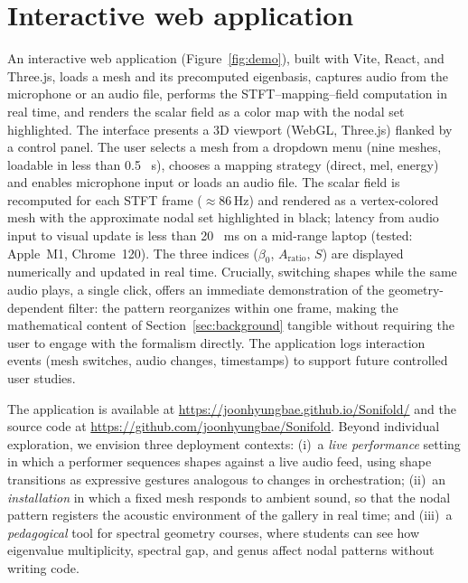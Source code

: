 \documentclass[]{interact}
\theoremstyle{plain}
\theoremstyle{definition}
\theoremstyle{remark}
\begin{document}
\section{Interactive web application}
\label{sec:interactive}

An interactive web application (Figure~\ref{fig:demo}), built with Vite, React, and Three.js, loads a mesh and its precomputed eigenbasis, captures audio from the microphone or an audio file, performs the STFT--mapping--field computation in real time, and renders the scalar field as a color map with the nodal set highlighted. The interface presents a 3D viewport (WebGL, Three.js) flanked by a control panel. The user selects a mesh from a dropdown menu (nine meshes, loadable in less than 0.5 \, s), chooses a mapping strategy (direct, mel, energy) and enables microphone input or loads an audio file. The scalar field is recomputed for each STFT frame (${\approx}86$\,Hz) and rendered as a vertex-colored mesh with the approximate nodal set highlighted in black; latency from audio input to visual update is less than 20 \, ms on a mid-range laptop (tested: Apple~M1, Chrome~120). The three indices ($\beta_0$, $A_{\mathrm{ratio}}$, $S$) are displayed numerically and updated in real time. Crucially, switching shapes while the same audio plays, a single click, offers an immediate demonstration of the geometry-dependent filter: the pattern reorganizes within one frame, making the mathematical content of Section~\ref{sec:background} tangible without requiring the user to engage with the formalism directly. The application logs interaction events (mesh switches, audio changes, timestamps) to support future controlled user studies.

The application is available at \url{https://joonhyungbae.github.io/Sonifold/} and the source code at \url{https://github.com/joonhyungbae/Sonifold}. Beyond individual exploration, we envision three deployment contexts: (i)~a \emph{live performance} setting in which a performer sequences shapes against a live audio feed, using shape transitions as expressive gestures analogous to changes in orchestration; (ii)~an \emph{installation} in which a fixed mesh responds to ambient sound, so that the nodal pattern registers the acoustic environment of the gallery in real time; and (iii)~a \emph{pedagogical} tool for spectral geometry courses, where students can see how eigenvalue multiplicity, spectral gap, and genus affect nodal patterns without writing code.
\end{document}

